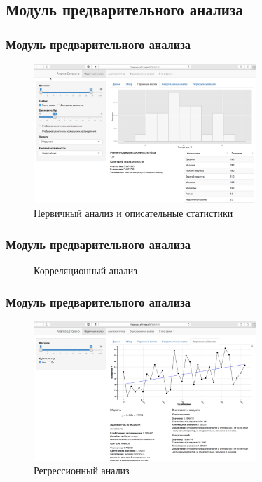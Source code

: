 \documentclass[10pt,pdf,aspectratio=169,hyperref={unicode}]{beamer}
\begin{document}
\subsection{Модуль предварительного анализа}

\begin{frame}
  \frametitle{Модуль предварительного анализа}
    \begin{figure}[h]
    \includegraphics[width=0.75\textwidth]{../../figures/static/1_basis.png}
    \caption{Первичный анализ и описательные статистики}
  \end{figure}
\end{frame}

\begin{frame}
  \frametitle{Модуль предварительного анализа}
  \begin{figure}[h]
    \caption{Корреляционный анализ}
  \end{figure}
\end{frame}

\begin{frame}
  \frametitle{Модуль предварительного анализа}
    \begin{figure}[h]
    \includegraphics[width=0.75\textwidth]{../../figures/static/2_regr.png}
    \caption{Регрессионный анализ}
  \end{figure}
\end{frame}
\end{document}
